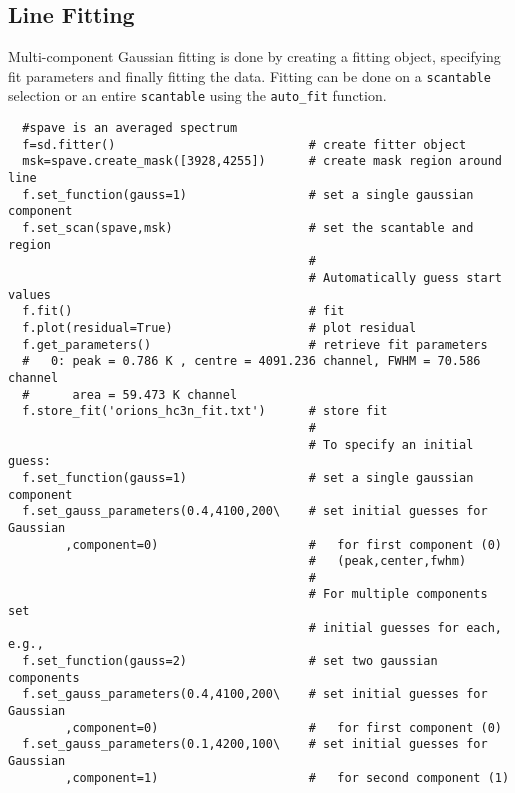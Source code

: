 \subsection{Line Fitting}
\label{subsection:sd.asap.LINEfitting}

Multi-component Gaussian fitting is done by
creating a fitting object, specifying fit parameters and finally
fitting the data. Fitting can be done on a {\tt scantable} selection
or an entire {\tt scantable} using the {\tt auto\_fit} function.

\small
\begin{verbatim}
  #spave is an averaged spectrum
  f=sd.fitter()                           # create fitter object
  msk=spave.create_mask([3928,4255])      # create mask region around line
  f.set_function(gauss=1)                 # set a single gaussian component
  f.set_scan(spave,msk)                   # set the scantable and region
                                          # 
                                          # Automatically guess start values
  f.fit()                                 # fit 
  f.plot(residual=True)                   # plot residual
  f.get_parameters()                      # retrieve fit parameters
  #   0: peak = 0.786 K , centre = 4091.236 channel, FWHM = 70.586 channel
  #      area = 59.473 K channel
  f.store_fit('orions_hc3n_fit.txt')      # store fit
                                          #
                                          # To specify an initial guess:
  f.set_function(gauss=1)                 # set a single gaussian component
  f.set_gauss_parameters(0.4,4100,200\    # set initial guesses for Gaussian
        ,component=0)                     #   for first component (0)
                                          #   (peak,center,fwhm)
                                          #
                                          # For multiple components set
                                          # initial guesses for each, e.g.,
  f.set_function(gauss=2)                 # set two gaussian components
  f.set_gauss_parameters(0.4,4100,200\    # set initial guesses for Gaussian
        ,component=0)                     #   for first component (0)
  f.set_gauss_parameters(0.1,4200,100\    # set initial guesses for Gaussian
        ,component=1)                     #   for second component (1)

\end{verbatim}
\normalsize

